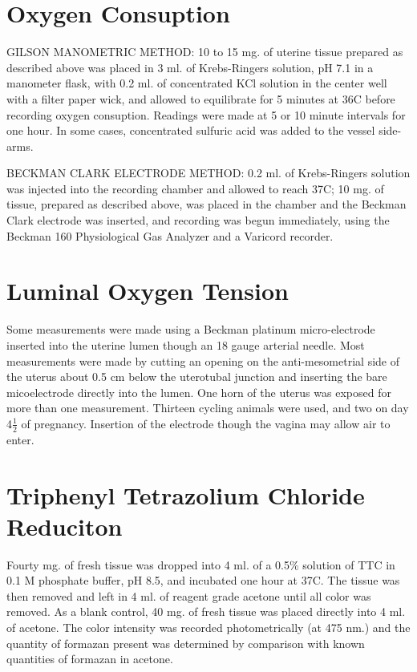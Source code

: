\section{Oxygen Consuption}

GILSON MANOMETRIC METHOD: 10 to 15 mg. of uterine tissue prepared as described above was placed in 3 ml. of Krebs-Ringers solution, pH 7.1 in a manometer flask, with 0.2 ml. of concentrated
KCl solution in the center well with a filter paper wick, and allowed to equilibrate for 5 minutes at 36\textdegree{}C  before recording oxygen consuption. Readings were made at 5 or 10 minute
intervals for one hour. In some cases, concentrated sulfuric acid was added to the vessel side-arms.

BECKMAN CLARK ELECTRODE METHOD: 0.2 ml. of Krebs-Ringers solution was injected into the recording chamber and allowed to reach 37\textdegree{}C; 10 mg. of tissue, prepared as described above, was
placed in the chamber and the Beckman Clark electrode was inserted, and recording was begun immediately, using the Beckman 160 Physiological Gas Analyzer and a Varicord recorder.

\section{Luminal Oxygen Tension}

Some measurements were made using a Beckman platinum micro-electrode inserted into the uterine lumen though an 18 gauge arterial needle. Most measurements were made by cutting an
opening on the anti-mesometrial side of the uterus about 0.5 cm below the uterotubal junction and inserting the bare micoelectrode directly into the lumen. One horn of the uterus
was exposed for more than one measurement. Thirteen cycling animals were used, and two on day 4$\frac{1}{2}$ of pregnancy. Insertion of the electrode though the vagina may allow air to enter.

\section{Triphenyl Tetrazolium Chloride Reduciton}

Fourty mg. of fresh tissue was dropped into 4 ml. of a 0.5\% solution of TTC in 0.1 M phosphate buffer, pH 8.5, and incubated one hour at 37\textdegree{}C. The tissue was then removed and left
in 4 ml. of reagent grade acetone until all color was removed. As a blank control, 40 mg. of fresh tissue was placed directly into 4 ml. of acetone. The color intensity was recorded
photometrically (at 475 nm.) and the quantity of formazan present was determined by comparison with known quantities of formazan in acetone.

